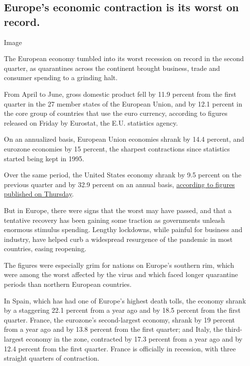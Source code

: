 \hypertarget{europes-economic-contraction-is-its-worst-on-record}{%
\subsection{Europe's economic contraction is its worst on
record.}\label{europes-economic-contraction-is-its-worst-on-record}}

Image

The European economy tumbled into its worst recession on record in the
second quarter, as quarantines across the continent brought business,
trade and consumer spending to a grinding halt.

From April to June, gross domestic product fell by 11.9 percent from the
first quarter in the 27 member states of the European Union, and by 12.1
percent in the core group of countries that use the euro currency,
according to figures released on Friday by Eurostat, the E.U. statistics
agency.

On an annualized basis, European Union economies shrank by 14.4 percent,
and eurozone economies by 15 percent, the sharpest contractions since
statistics started being kept in 1995.

Over the same period, the United States economy shrank by 9.5 percent on
the previous quarter and by 32.9 percent on an annual basis,
\href{https://www.nytimes.com/2020/07/30/business/economy/q2-gdp-coronavirus-economy.html}{according
to figures published on Thursday}.

But in Europe, there were signs that the worst may have passed, and that
a tentative recovery has been gaining some traction as governments
unleash enormous stimulus spending. Lengthy lockdowns, while painful for
business and industry, have helped curb a widespread resurgence of the
pandemic in most countries, easing reopening.

The figures were especially grim for nations on Europe's southern rim,
which were among the worst affected by the virus and which faced longer
quarantine periods than northern European countries.

In Spain, which has had one of Europe's highest death tolls, the economy
shrank by a staggering 22.1 percent from a year ago and by 18.5 percent
from the first quarter. France, the eurozone's second-largest economy,
shrank by 19 percent from a year ago and by 13.8 percent from the first
quarter; and Italy, the third-largest economy in the zone, contracted by
17.3 percent from a year ago and by 12.4 percent from the first quarter.
France is officially in recession, with three straight quarters of
contraction.

